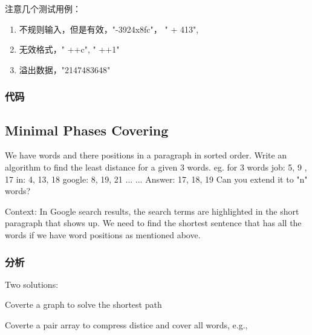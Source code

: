 注意几个测试用例：
\begin{enumerate}
\item 不规则输入，但是有效，"-3924x8fc"， "  +  413",
\item 无效格式，" ++c", " ++1"
\item 溢出数据，"2147483648"
\end{enumerate}


\subsubsection{代码}

\subsection{Minimal Phases Covering}

We have words and there positions in a paragraph in sorted order. Write an 
algorithm to find the least distance for a given 3 words. 
eg. for 3 words 
job: 5, 9 , 17 
in: 4, 13, 18 
google: 8, 19, 21 
... 
... 
Answer: 17, 18, 19 
Can you extend it to "n" words? 

Context: In Google search results, the search terms are highlighted in the 
short paragraph that shows up. We need to find the shortest sentence that has 
all the words if we have word positions as mentioned above.

\subsubsection{分析}
Two solutions:
\begindot
	\item Coverte a graph to solve the shortest path
	\item Coverte a pair array to compress distice and cover all words, e.g.,
	
